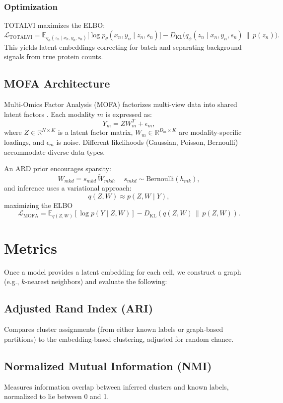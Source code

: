 \documentclass{article}
\begin{document}
\subsubsection{Optimization}
TOTALVI maximizes the ELBO:
\[
\mathcal{L}_{\mathrm{TOTALVI}}
= \mathbb{E}_{q_{\phi}(z_n \mid x_n, y_n, s_n)} \bigl[\log p_{\theta}(x_n, y_n \mid z_n, s_n)\bigr]
- D_{\mathrm{KL}}\bigl(q_{\phi}(z_n \mid x_n, y_n, s_n)\,\|\,p(z_n)\bigr).
\]
This yields latent embeddings correcting for batch and separating background signals from true protein counts.

\subsection{MOFA Architecture}
\label{sec:mofa}
Multi-Omics Factor Analysis (MOFA) factorizes multi-view data into shared latent factors \cite{https://doi.org/10.15252/msb.20178124}. 
Each modality \(m\) is expressed as:
\[
Y_m = Z W_m^T + \epsilon_m,
\]
where \(Z\in\mathbb{R}^{N\times K}\) is a latent factor matrix, 
\(W_m\in\mathbb{R}^{D_m\times K}\) are modality-specific loadings, and \(\epsilon_m\) is noise. 
Different likelihoods (Gaussian, Poisson, Bernoulli) accommodate diverse data types.

An ARD prior encourages sparsity:
\[
W_{mkd} = s_{mkd}\,\tilde{W}_{mkd}, \quad s_{mkd}\sim \mathrm{Bernoulli}(h_{mk}), 
\]
and inference uses a variational approach:
\[
q(Z,W) \approx p(Z, W \mid Y),
\]
maximizing the ELBO
\[
\mathcal{L}_{\mathrm{MOFA}} = \mathbb{E}_{q(Z,W)}[\log p(Y\mid Z,W)] - D_{\mathrm{KL}}(q(Z,W)\,\|\,p(Z,W)).
\]

\section{Metrics}
Once a model provides a latent embedding for each cell, we construct a graph (e.g., \(k\)-nearest neighbors) 
and evaluate the following:

\subsection{Adjusted Rand Index (ARI)}
Compares cluster assignments (from either known labels or graph-based partitions) to the embedding-based clustering, 
adjusted for random chance.

\subsection{Normalized Mutual Information (NMI)}
Measures information overlap between inferred clusters and known labels, normalized to lie between 0 and 1.
\end{document}
